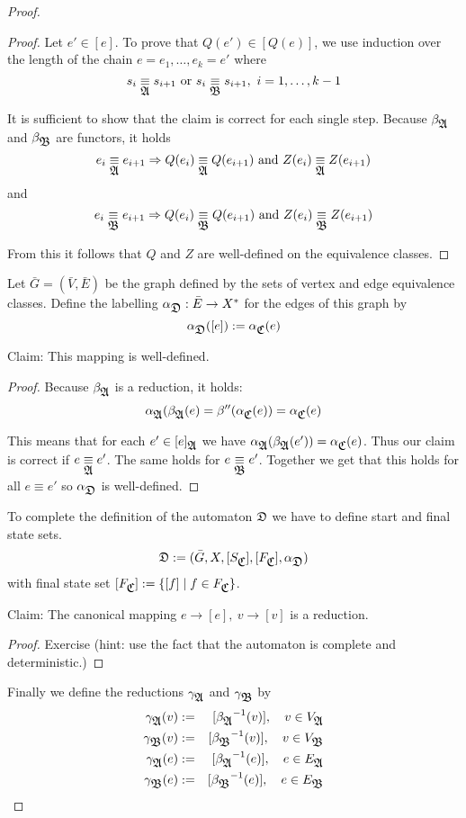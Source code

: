 \begin{proof}
\begin{proof}
Let $e' \in [e]$. To prove that $Q(e') \in [Q(e)]$, we use induction over
the length of the chain $e = e_1, \ldots, e_k = e'$ where
\[ s_i \underset{\mbox{$\mathfrak{A}$}}{\equiv} s_{i+1}\text{ or }s_i \underset{\mbox{$\mathfrak{B}$}}{\equiv} s_{i+1},\ i =
1, \ldots, k-1 \]

It is sufficient to show that the claim is correct for each single step. Because
$\beta_{\mbox{$\mathfrak{A}$}}$ and $\beta_{\mbox{$\mathfrak{B}$}}$ are functors, it holds
\[ e_i \underset{\mbox{$\mathfrak{A}$}}{\equiv} e_{i+1} \Rightarrow Q(e_i) \underset{\mbox{$\mathfrak{A}$}}{\equiv} Q(e_{i+1}) \text{
and }Z(e_i) \underset{\mbox{$\mathfrak{A}$}}{\equiv} Z(e_{i+1}) \]
and
\[ e_i \underset{\mbox{$\mathfrak{B}$}}{\equiv} e_{i+1} \Rightarrow Q(e_i) \underset{\mbox{$\mathfrak{B}$}}{\equiv} Q(e_{i+1}) \text{ and
}Z(e_i) \underset{\mbox{$\mathfrak{B}$}}{\equiv} Z(e_{i+1}) \]

From this it follows that $Q$ and $Z$ are well-defined on the equivalence
classes.
\end{proof}

\medskip
Let $\bar{G} = (\bar{V}, \bar{E})$ be the graph defined by the sets of vertex
and edge equivalence classes. Define the labelling $\alpha_{\mbox{$\mathfrak{D}$}} : \bar{E}
\to X^*$ for the edges of this graph by
\[ \alpha_{\mbox{$\mathfrak{D}$}}([e]) := \alpha_{\mbox{$\mathfrak{C}$}}(e) \]

Claim: This mapping is well-defined. 

\begin{proof}
Because $\beta_{\mbox{$\mathfrak{A}$}}$ is a reduction, it holds:
\[ \alpha_{\mbox{$\mathfrak{A}$}}(\beta_{\mbox{$\mathfrak{A}$}}(e) = \beta''(\alpha_{\mbox{$\mathfrak{C}$}}(e)) =
\alpha_{\mbox{$\mathfrak{C}$}}(e) \]

This means that for each $e' \in [e]_{\mbox{$\mathfrak{A}$}}$ we have
$\alpha_{\mbox{$\mathfrak{A}$}}(\beta_{\mbox{$\mathfrak{A}$}}(e')) = \alpha_{\mbox{$\mathfrak{C}$}}(e)$. Thus our claim is
correct if $e \underset{\mbox{$\mathfrak{A}$}}{\equiv} e'$. The same holds for $e \underset{\mbox{$\mathfrak{B}$}}{\equiv} e'$. Together
we get that this holds for all $e \equiv e'$ so $\alpha_{\mbox{$\mathfrak{D}$}}$ is
well-defined.
\end{proof}

To complete the definition of the automaton $\mbox{$\mathfrak{D}$}$ we have to define start and
final state sets.
\[ \mbox{$\mathfrak{D}$} := (\bar{G}, X, [S_{\mbox{$\mathfrak{C}$}}], [F_{\mbox{$\mathfrak{C}$}}], \alpha_{\mbox{$\mathfrak{D}$}}) \]
with final state set $[F_{\mbox{$\mathfrak{C}$}}] := \mbox{$\{[f] \mid f \in F_{\mbox{$\mathfrak{C}$}}\}$}$.

Claim: The canonical mapping $e \to [e],\ v \to [v]$ is a reduction.

\begin{proof}
Exercise (hint: use the fact that the automaton is complete and deterministic.)
\end{proof}

Finally we define the reductions $\gamma_{\mbox{$\mathfrak{A}$}}$ and $\gamma_{\mbox{$\mathfrak{B}$}}$ by
\begin{eqnarray*}
\gamma_{\mbox{$\mathfrak{A}$}}(v) & := & [\mbox{${\beta_{\mbox{$\mathfrak{A}$}}}^{-1}$}(v)], \quad v \in V_{\mbox{$\mathfrak{A}$}} \\
\gamma_{\mbox{$\mathfrak{B}$}}(v) & := & [\mbox{${\beta_{\mbox{$\mathfrak{B}$}}}^{-1}$}(v)], \quad v \in V_{\mbox{$\mathfrak{B}$}} \\
\gamma_{\mbox{$\mathfrak{A}$}}(e) & := & [\mbox{${\beta_{\mbox{$\mathfrak{A}$}}}^{-1}$}(e)], \quad e \in E_{\mbox{$\mathfrak{A}$}} \\
\gamma_{\mbox{$\mathfrak{B}$}}(e) & := & [\mbox{${\beta_{\mbox{$\mathfrak{B}$}}}^{-1}$}(e)], \quad e \in E_{\mbox{$\mathfrak{B}$}}
\end{eqnarray*}
\end{proof}

